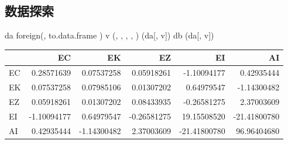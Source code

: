 \subsection{数据探索}
\begin{code}
da \ROperator{<-} foreign\ROperator{::}(, to.data.frame \ROperator{=} )
v \ROperator{<-} (, , , , )   
(da[, v])
db \ROperator{<-} (da[, v])
\end{code}
\par\addvspace{5pt}\begin{center}\begin{minipage}{\linewidth}\centering
\small
{}
\begin{tabular}{lrrrrr}\toprule
 &{\bfseries  EC }&{\bfseries  EK }&{\bfseries  EZ }&{\bfseries  EI }&{\bfseries  AI}\\\midrule
EC & 0.28571639 & 0.07537258 & 0.05918261 & -1.10094177 & 0.42935444\\
EK & 0.07537258 & 0.07985106 & 0.01307202 & 0.64979547 & -1.14300482\\
EZ & 0.05918261 & 0.01307202 & 0.08433935 & -0.26581275 & 2.37003609\\
EI & -1.10094177 & 0.64979547 & -0.26581275 & 19.15508520 & -21.41800780\\
AI & 0.42935444 & -1.14300482 & 2.37003609 & -21.41800780 & 96.96404680\\
\bottomrule\end{tabular}
\end{minipage}\end{center}


